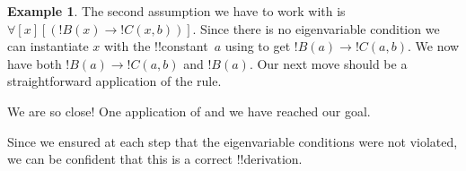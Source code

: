 \documentclass[10pt,a4paper]{article}
\theoremstyle{plain}
\theoremstyle{definition}
\newtheorem{ex}[thm]{Example}
\theoremstyle{remark}
\providecommand{\AxiomC}[1]{}
\providecommand{\UnaryInfC}[1]{}
\providecommand{\BinaryInfC}[1]{}
\providecommand{\RightLabel}[1]{}
\newenvironment{prooftree}{}{}
\providecommand{\lif}{\mathbin{\rightarrow}}
\providecommand{\lforall}{\mathord{\forall}}
\providecommand{\lexists}{\mathord{\exists}}
\providecommand{\Elim}[1]{}
\providecommand{\Intro}[1]{}
\providecommand{\Discharge}{\mathrm{Dis}}
\providecommand{\Intro}{\mathrm{I}}
\begin{document}
\begin{ex}
The second assumption we have to work with is~$\lforall[x][(!B(x) \lif
  !C(x,b))]$. Since there is no eigenvariable condition we can
instantiate $x$ with the !!{constant}~$a$ using \Elim{\lforall} to get
$!B(a) \lif !C(a, b)$.  We now have both $!B(a) \lif !C(a,b)$ and
$!B(a)$. Our next move should be a straightforward application of the
\Elim{\lif} rule.
\begin{prooftree}
\AxiomC{$\lexists[x][(!A(x) \land !B(x))]$}
\AxiomC{$\lforall[x][(!B(x) \lif !C(x,b))]$}
\RightLabel{\Elim{\lforall}}
\UnaryInfC{$!B(a) \lif !C(a,b)$}
\AxiomC{$\Discharge{!A(a) 
\land !B(a)}{1}$}
\RightLabel{\Elim{\land}}
\UnaryInfC{$!B(a)$}
\RightLabel{\Elim{\lif}}
\BinaryInfC{$!C(a,b)$}
\DeduceC{$\lexists[x][!C(x,b)]$}
\DischargeRule{\Elim{\lexists}}{1}
\insertBetweenHyps{\hspace{-5em}}
\BinaryInfC{$\lexists[x][!C(x,b)]$}
\end{prooftree}
We are so close!{} One application of \Intro{\lexists} and we
have reached our goal.
\begin{prooftree}
\AxiomC{$\lexists[x][(!A(x) \land !B(x))]$}
\AxiomC{$\lforall[x][(!B(x) \lif !C(x,b))]$}
\RightLabel{\Elim{\lforall}}
\UnaryInfC{$!B(a) \lif !C(a,b)$}
\AxiomC{$\Discharge{!A(a) 
\land !B(a)}{1}$}
\RightLabel{\Elim{\land}}
\UnaryInfC{$!B(a)$}
\RightLabel{\Elim{\lif}}
\BinaryInfC{$!C(a,b)$}
\RightLabel{\Intro{\lexists}}
\UnaryInfC{$\lexists[x][!C(x,b)]$}
\DischargeRule{\Elim{\lexists}}{1}
\insertBetweenHyps{\hspace{-5em}}
\BinaryInfC{$\lexists[x][!C(x,b)]$}
\end{prooftree}
Since we ensured at each step that the eigenvariable
conditions were not violated, we can be confident that this
is a correct !!{derivation}.
\end{ex}
\end{document}
